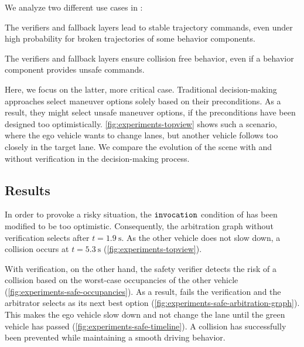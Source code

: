 We analyze two different use cases
in \cite{orzechowskiVerhaltensentscheidungFuerAutomatisierte2023}:
%
\begin{description}[align=left]
    \item[Ensuring driveability]
        The verifiers and fallback layers lead to stable trajectory commands,
        even under high probability for broken trajectories of some behavior components.
    \item[Guaranteeing vehicle safety]
        The verifiers and fallback layers ensure collision free behavior,
        even if a behavior component provides unsafe commands.
\end{description}

Here, we focus on the latter, more critical case.
Traditional decision-making approaches select maneuver options solely based on their preconditions.
As a result, they might select unsafe maneuver options,
if the preconditions have been designed too optimistically.
%
\cref{fig:experiments-topview} shows such a scenario, where the ego vehicle wants to change lanes,
but another vehicle follows too closely in the target lane.
We compare the evolution of the scene with and without verification in the decision-making process.


\subsection{Results}



In order to provoke a risky situation,
the $\texttt{invocation}$ condition of  has been modified to be too optimistic.
Consequently, the arbitration graph without verification selects  after $t=\SI{1.9}{\second}$.
As the other vehicle does not slow down, a collision occurs at $t=\SI{5.3}{\second}$ (\cref{fig:experiments-topview}).

With verification, on the other hand, the safety verifier detects the risk of a collision based on the worst-case occupancies of the other vehicle (\cref{fig:experiments-safe-occupancies}).
As a result,  fails the verification and
the  arbitrator selects 
as its next best option (\cref{fig:experiments-safe-arbitration-graph}).
This makes the ego vehicle slow down and not change the lane
until the green vehicle has passed (\cref{fig:experiments-safe-timeline}).
A collision has successfully been prevented
while maintaining a smooth driving behavior.
